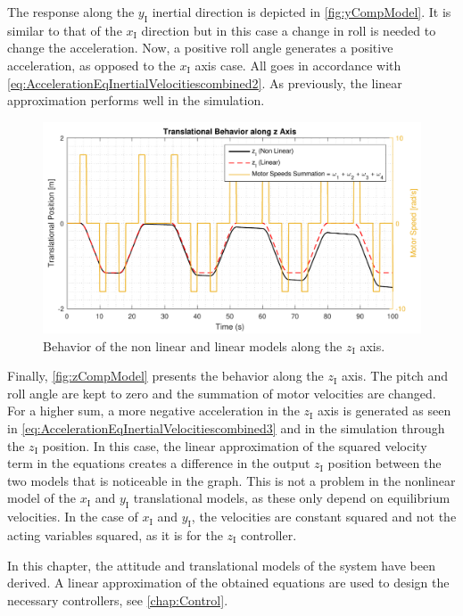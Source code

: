 The response along the $y_{\mathrm{I}}$ inertial direction is depicted in \autoref{fig:yCompModel}. It is similar to that of the $x_{\mathrm{I}}$ direction but in this case a change in roll is needed to change the acceleration. Now, a positive roll angle generates a positive acceleration, as opposed to the $x_{\mathrm{I}}$ axis case. All goes in accordance with \autoref{eq:AccelerationEqInertialVelocitiescombined2}. As previously, the linear approximation performs well in the simulation.
 
\begin{figure}[H]
	\centering
	\includegraphics[scale=0.65]{figures/zCompModel}
	\caption{Behavior of the non linear and linear models along the $z_{\mathrm{I}}$ axis.}
	\label{fig:zCompModel}
\end{figure}
Finally, \autoref{fig:zCompModel} presents the behavior along the $z_{\mathrm{I}}$ axis. The pitch and roll angle are kept to zero and the summation of motor velocities are changed. For a higher sum, a more negative acceleration in the $z_{\mathrm{I}}$ axis is generated as seen in \autoref{eq:AccelerationEqInertialVelocitiescombined3} and in the simulation through the $z_{\mathrm{I}}$ position. In this case, the linear approximation of the squared velocity term in the equations creates a difference in the output $z_{\mathrm{I}}$ position between the two models that is noticeable in the graph. 
This is not a problem in the nonlinear model of the $x_{\mathrm{I}}$ and $y_{\mathrm{I}}$ translational models, as these only depend on equilibrium velocities. In the case of $x_{\mathrm{I}}$ and $y_{\mathrm{I}}$, the velocities are constant squared and not the acting variables squared, as it is for the $z_{\mathrm{I}}$ controller.

In this chapter, the attitude and translational models of the system have been derived. A linear approximation of the obtained equations are used to design the necessary controllers, see \autoref{chap:Control}.
